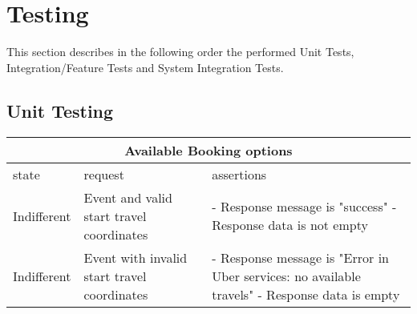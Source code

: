 \section{Testing}

This section describes in the following order the performed Unit Tests, Integration/Feature Tests and System Integration Tests.

\subsection{Unit Testing}

\begin{center}
	\begin{tabular}{|p{}|p{}|p{}|}
		\hline
		\multicolumn{3}{c}{Available Booking options}\\
		
		\hline
		state & request & assertions \\
		
		\hline
		Indifferent &
		Event and valid start travel coordinates &
		- Response message is "success" \newline
		- Response data is not empty 
		\\
		
		\hline
		Indifferent &
		Event with invalid start travel coordinates &
		- Response message is "Error in Uber services: no available travels" \newline
		- Response data is empty 
		\\
		
		\hline
		
	\end{tabular}
\end{center}


